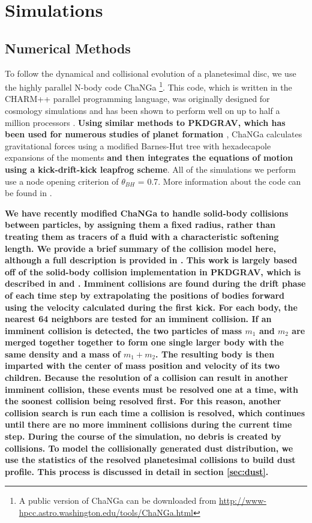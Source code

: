 \documentclass[fleqn,usenatbib]{mnras}
\begin{document}
\section{Simulations} \label{sec:sims}

\subsection{Numerical Methods}\label{sec:methods}

To follow the dynamical and collisional evolution of a planetesimal disc, we use the highly parallel N-body code {\sc ChaNGa} 
\footnote{A public version of {\sc ChaNGa} can be downloaded from \url{http://www-hpcc.astro.washington.edu/tools/ChaNGa.html}}. 
This code, which is written in the {\sc CHARM++} parallel programming language, was originally designed for cosmology simulations 
and has been shown to perform well on up to half a million processors \citep{2015AphCom..2..1}. \textbf{Using similar methods to {\sc PKDGRAV}, which has been used for numerous studies of planet formation \citep{2000Icar..143...45R, 2005ApJ...625..427L, 2013ApJ...777L..31D, 2015ApJ...806...23L}}, {\sc ChaNGa} calculates 
gravitational forces using a modified Barnes-Hut \citep{1986Natur.324..446B} tree with hexadecapole expansions of the moments \textbf{and then integrates the equations of motion using a kick-drift-kick leapfrog scheme}. 
All of the simulations we perform use a node opening criterion of $\theta_{BH}$ = 0.7. More information about the code can be found 
in \citet{2008IEEEpds...ChaNGa}.

\textbf{We have recently modified {\sc ChaNGa} to handle solid-body collisions between particles, by assigning them a fixed radius, rather than treating them as tracers of a fluid with a characteristic softening length. We provide a brief summary of the collision model here, although a full description is provided in \citet{2019MNRAS.489.2159W}. This work is largely based off of the solid-body collision implementation in {\sc PKDGRAV}, which is described in \citet{1994MNRAS.269..493R} and \citet{2000Icar..143...45R}. Imminent collisions are found during the drift phase of each time step by extrapolating the positions of bodies forward using the velocity calculated during the first kick. For each body, the nearest 64 neighbors are tested for an imminent collision. If an imminent collision is detected, the two particles of mass $m_{1}$ and $m_{2}$ are merged together together to form one single larger body with the same density and a mass of $m_{1} + m_{2}$. The resulting body is then imparted with the center of mass position and velocity of its two children. Because the resolution of a collision can result in another imminent collision, these events must be resolved one at a time, with the soonest collision being resolved first. For this reason, another collision search is run each time a collision is resolved, which continues until there are no more imminent collisions during the current time step. During the course of the simulation, no debris is created by collisions. To model the collisionally generated dust distribution, we use the statistics of the resolved planetesimal collisions to build dust profile. This process is discussed in detail in section \ref{sec:dust}.}
\end{document}
